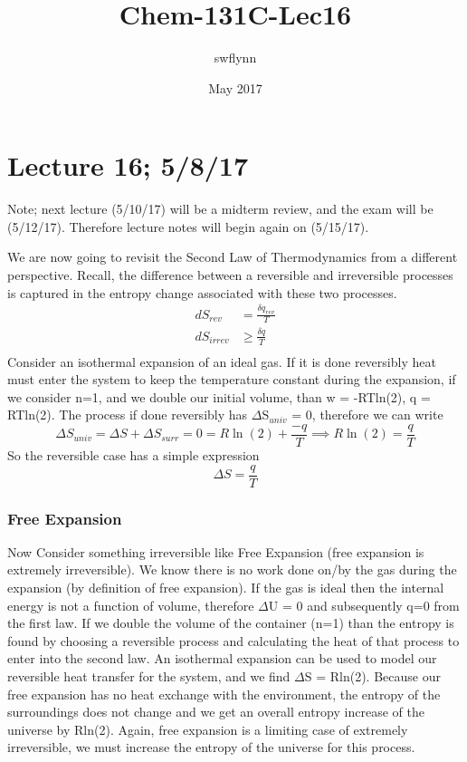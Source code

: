 \documentclass{article}
\title{Chem-131C-Lec16}
\author{swflynn}
\date{May 2017}
\begin{document}
\maketitle

\section*{Lecture 16; 5/8/17}
Note; next lecture (5/10/17) will be a midterm review, and the exam will be (5/12/17).
Therefore lecture notes will begin again on (5/15/17).

We are now going to revisit the Second Law of Thermodynamics from a different perspective. 
Recall, the difference between a reversible and irreversible processes is captured in the entropy change associated with these two processes. 
\begin{equation}
    \begin{split}
        dS_{rev} &= \frac{\delta q_{rev}}{T} \\
        dS_{irrev} &\geq \frac{\delta q}{T} \\
    \end{split}
\end{equation}
Consider an isothermal expansion of an ideal gas. 
If it is done reversibly heat must enter the system to keep the temperature constant during the expansion, if we consider n=1, and we double our initial volume, than w = -RTln(2), q = RTln(2). 
The process if done reversibly has $\Delta$S$_{univ}$ = 0, therefore we can write
\begin{equation}
    \Delta S_{univ} = \Delta S + \Delta S_{surr} =  0 = R\ln(2) + \frac{-q}{T} \implies R\ln(2) = \frac{q}{T}
\end{equation}
So the reversible case has a simple expression
\begin{equation}
    \Delta S = \frac{q}{T}
\end{equation}

\subsubsection*{Free Expansion}
Now Consider something irreversible like Free Expansion (free expansion is extremely irreversible). 
We know there is no work done on/by the gas during the expansion (by definition of free expansion). 
If the gas is ideal then the internal energy is not a function of volume, therefore $\Delta$U = 0 and subsequently q=0 from the first law. 
If we double the volume of the container (n=1) than the entropy is found by choosing a reversible process and calculating the heat of that process to enter into the second law.
An isothermal expansion can be used to model our reversible heat transfer for the system, and we find $\Delta$S = Rln(2). 
Because our free expansion has no heat exchange with the environment, the entropy of the surroundings does not change and we get an overall entropy increase of the universe by Rln(2).
Again, free expansion is a limiting case of extremely irreversible, we must increase the entropy of the universe for this process. 
\end{document}

